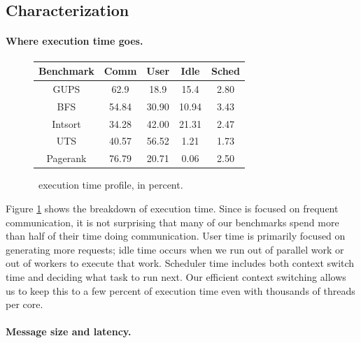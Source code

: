 \subsection{Characterization}

\paragraph{Where execution time goes.}


\begin{figure}[ht]
    \begin{center}
      \begin{tabular}{c|c c c c}
        Benchmark     & Comm & User & Idle & Sched \\ \hline
        GUPS          & 62.9  & 18.9    & 15.4 & 2.80 \\ 
        BFS           & 54.84 & 30.90   & 10.94 & 3.43 \\ 
        Intsort       & 34.28 & 42.00   & 21.31 & 2.47 \\ 
        UTS           & 40.57 & 56.52   &  1.21 & 1.73 \\
        Pagerank      & 76.79 & 20.71   &  0.06 & 2.50 \\
      \end{tabular}
    \end{center}
    \caption{\Grappa\ execution time profile, in percent.}
    \label{fig:grappa-profile}
\end{figure}

Figure \ref{fig:grappa-profile} shows the breakdown of execution
time. Since \Grappa is focused on frequent communication, it is not
surprising that many of our benchmarks spend more than half of their
time doing communication. User time is primarily focused on generating
more requests; idle time occurs when we run out of parallel work or
out of workers to execute that work. Scheduler time includes both
context switch time and deciding what task to run next. Our efficient
context switching allows us to keep this to a few percent of execution
time even with thousands of threads per core.

\paragraph{Message size and latency.}

